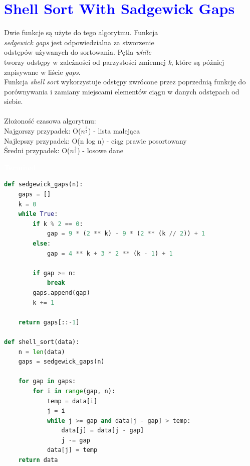 \documentclass{article}
\begin{document}
	\section*{\textcolor{blue}{Shell Sort With Sadgewick Gaps}}
	\begin{multicols}{2}
		\noindent Dwie funkcje są użyte do tego algorytmu. Funkcja \\ \textit{sedgewick gaps} jest odpowiedzialna za stworzenie \\odstępów używanych do sortowania. Pętla \textit{while} \\tworzy odstępy w zależności od parzystości zmiennej \textit{k}, które są później zapisywane w liście \textit{gaps}. \\Funkcja \textit{shell sort} wykorzystuje odstępy zwrócone przez poprzednią funkcję do porównywania i zamiany miejscami elementów ciągu w danych odstępach od \\siebie. \\
		\\Złożoność czasowa algorytmu: \\Najgorszy przypadek: O($n^{\frac{3}{2}}$) - lista malejąca \\Najlepszy przypadek: O(n log n) - ciąg prawie posortowany \\Średni przypadek: O($n^{\frac{4}{3}}$) - losowe dane
		
		\noindent 
		\begin{tcolorbox}[colback=black,colframe=gray!50!,arc=3mm,boxrule=0pt,left=0pt,right=0pt,width=\linewidth]
			\textcolor{white}{\textbf{\textsf{Terminal}}}\\
			
			\begin{lstlisting}[language=Python]
def sedgewick_gaps(n):
	gaps = []
	k = 0
	while True:
		if k % 2 == 0:
			gap = 9 * (2 ** k) - 9 * (2 ** (k // 2)) + 1
		else:
			gap = 4 ** k + 3 * 2 ** (k - 1) + 1

		if gap >= n:
			break
		gaps.append(gap)
		k += 1

	return gaps[::-1]

def shell_sort(data):
	n = len(data)
	gaps = sedgewick_gaps(n)

	for gap in gaps:
		for i in range(gap, n):
			temp = data[i]
			j = i
			while j >= gap and data[j - gap] > temp:
				data[j] = data[j - gap]
				j -= gap
			data[j] = temp
	return data
			\end{lstlisting}
			
		\end{tcolorbox}
	\end{multicols}
	
\end{document}
